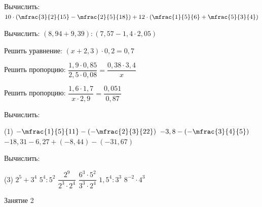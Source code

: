 %
%

\begin{class}[number=1]
	
	\begin{listofex}
		\item Вычислить: \( 10\cdot\left( \mfrac{3}{2}{15}-\mfrac{2}{5}{18} \right)+12\cdot\left( \mfrac{1}{5}{6}+\mfrac{5}{3}{4} \right) \)
		\item Вычислить: \( (8,94+9,39):(7,57-1,4\cdot2,05) \)
		\item Решить уравнение: \( (x+2,3)\cdot0,2=0,7 \)
		\item Решить пропорцию: \( \dfrac{1,9\cdot0,85}{2,5\cdot0,08}=\dfrac{0,38\cdot3,4}{x} \)
		\item Решить пропорцию: \( \dfrac{1,6\cdot1,7}{x\cdot2,9}=\dfrac{0,051}{0,87} \)
		\item Вычислить:
		\begin{tasks}(1)
			\task \( -\mfrac{1}{5}{11}-\left( -\mfrac{2}{3}{22} \right) \)
			\task \( -3,8-\left( -\mfrac{3}{4}{5} \right) \)
			\task \( -18,31-6,27+(-8,44)-(-31,67) \)
		\end{tasks}
		\item Вычислить:
		\begin{tasks}(3)
			\task \( 2^5+3^4 \)
			\task \( 5^4:5^2 \)
			\task \( \dfrac{2^9}{2^3\cdot2^4} \)
			\task \( \dfrac{6^3\cdot5^2}{3^3\cdot2^4} \)
			\task \( 1,5^4:3^3 \)
			\task \( 8^{-2}\cdot4^3 \)
		\end{tasks}
	\end{listofex}
\end{class}

\begin{class}[number=2]
	\begin{listofex}
		\item Занятие 2
	\end{listofex}
\end{class}

